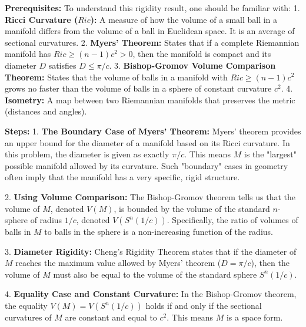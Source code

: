 \begin{solution}
\textbf{Prerequisites:}
To understand this rigidity result, one should be familiar with:
1. \textbf{Ricci Curvature ($Ric$):} A measure of how the volume of a small ball in a manifold differs from the volume of a ball in Euclidean space. It is an average of sectional curvatures.
2. \textbf{Myers' Theorem:} States that if a complete Riemannian manifold has $Ric \ge (n-1)c^2 > 0$, then the manifold is compact and its diameter $D$ satisfies $D \leq \pi/c$.
3. \textbf{Bishop-Gromov Volume Comparison Theorem:} States that the volume of balls in a manifold with $Ric \ge (n-1)c^2$ grows no faster than the volume of balls in a sphere of constant curvature $c^2$.
4. \textbf{Isometry:} A map between two Riemannian manifolds that preserves the metric (distances and angles).
\par\vspace{\baselineskip}

\textbf{Steps:}
1. \textbf{The Boundary Case of Myers' Theorem:}
Myers' theorem provides an upper bound for the diameter of a manifold based on its Ricci curvature. In this problem, the diameter is given as exactly $\pi/c$. This means $M$ is the "largest" possible manifold allowed by its curvature. Such "boundary" cases in geometry often imply that the manifold has a very specific, rigid structure.
\par\vspace{\baselineskip}

2. \textbf{Using Volume Comparison:}
The Bishop-Gromov theorem tells us that the volume of $M$, denoted $V(M)$, is bounded by the volume of the standard $n$-sphere of radius $1/c$, denoted $V(S^n(1/c))$. Specifically, the ratio of volumes of balls in $M$ to balls in the sphere is a non-increasing function of the radius.
\par\vspace{\baselineskip}

3. \textbf{Diameter Rigidity:}
Cheng's Rigidity Theorem states that if the diameter of $M$ reaches the maximum value allowed by Myers' theorem ($D = \pi/c$), then the volume of $M$ must also be equal to the volume of the standard sphere $S^n(1/c)$.
\par\vspace{\baselineskip}

4. \textbf{Equality Case and Constant Curvature:}
In the Bishop-Gromov theorem, the equality $V(M) = V(S^n(1/c))$ holds if and only if the sectional curvatures of $M$ are constant and equal to $c^2$. This means $M$ is a space form.
\par\vspace{\baselineskip}


\end{solution}
